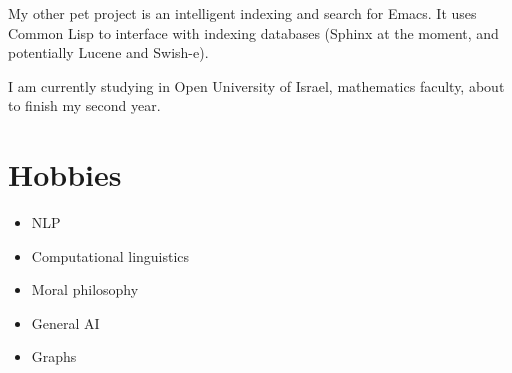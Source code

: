 \documentclass[11pt]{article}
\begin{document}
My other pet project is an intelligent indexing and search for Emacs.  It uses
Common Lisp to interface with indexing databases (Sphinx at the moment, and
potentially Lucene and Swish-e).

I am currently studying in Open University of Israel, mathematics faculty,
about to finish my second year.

\section{Hobbies}
\label{sec:orgheadline15}
\begin{itemize}
\item NLP
\item Computational linguistics
\item Moral philosophy
\item General AI
\item Graphs
\end{itemize}
\end{document}
